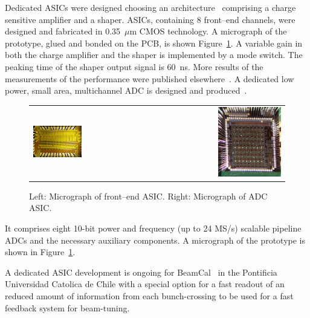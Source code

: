 Dedicated ASICs were designed choosing
an
architecture~\cite{Boie1982365,Gatti:1986qq}
comprising a charge sensitive amplifier and a shaper.
ASICs, containing 8 front--end channels, were designed and fabricated in 0.35~$\mu$m CMOS technology.
A micrograph of the prototype, glued and bonded on the PCB, is shown Figure~\ref{fig:frontend_photo}.
A variable gain in both the charge amplifier and
the shaper is implemented by a mode switch. The peaking time of the shaper output signal is 60~ns.
More results of the measurements of the performance were published elsewhere~\cite{4600902}.
A dedicated low power, small area, multichannel ADC is designed and produced~\cite{6156491}.
\begin{figure}[hbp]
\begin{center}
 \begin{tabular}{rrr}
    \includegraphics[width=0.4\columnwidth]{Calorimeter/FCAL/figs/fcal_lumical_fe_photo}
     &~~~~~~&
 \includegraphics[width=0.4\textwidth,height=0.28\textwidth]{Calorimeter/FCAL/figs/adc_asic_photo.png} \\

\end{tabular}
   \end{center}
          \caption{Left: Micrograph of front--end ASIC.
               Right: Micrograph of ADC ASIC.}
    \label{fig:frontend_photo}
\end{figure}
It comprises eight 10-bit power and frequency (up to 24 MS/s) scalable pipeline ADCs and the necessary
auxiliary components.
A micrograph of the prototype is shown in Figure~\ref{fig:frontend_photo}.

A dedicated ASIC development is ongoing for BeamCal~\cite{6200898}
in the Pontificia Universidad Catolica de Chile with a special option for a fast readout of an reduced amount of
information from each bunch-crossing to be used for a fast feedback system for beam-tuning.

